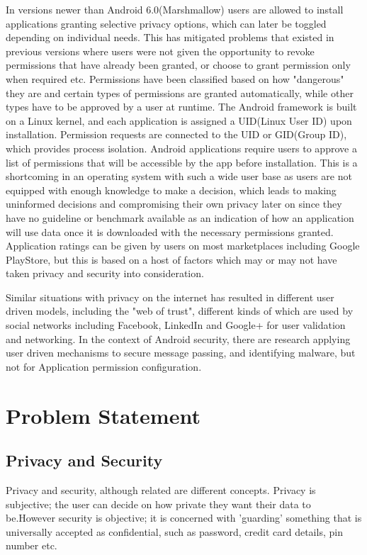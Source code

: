 In versions newer than Android 6.0(Marshmallow) users are allowed to install applications granting selective privacy options, which can later be toggled depending on individual needs. This has mitigated problems that existed in previous versions where users were not given the opportunity to revoke permissions that have already been granted, or choose to grant permission only when required etc. Permissions have been classified based on how "dangerous" they are and certain types of permissions are granted automatically, while other types have to be approved by a user at runtime. The Android framework is built on a Linux kernel, and each application is assigned a UID(Linux User ID) upon installation. Permission requests are connected to the UID or GID(Group ID), which provides process isolation. Android applications require users to approve a list of permissions that will be accessible by the app before installation. This is a shortcoming in an operating system with such a wide user base as users are not equipped with enough knowledge to make a decision, which leads to making uninformed decisions and compromising their own privacy later on since they have no guideline or benchmark available as an indication of how an application will use data once it is downloaded with the necessary permissions granted. Application ratings can be given by users on most marketplaces including Google PlayStore, but this is based on a host of factors which may or may not have taken privacy and security into consideration.
\smallskip

Similar situations with privacy on the internet has resulted in different user driven models, including the "web of trust", different kinds of which are used by social networks including Facebook, LinkedIn and Google+ for user validation and networking\cite{d}. In the context of Android security, there are research applying user driven mechanisms to secure message passing, and identifying malware, but not for Application permission configuration\cite{aziz2012android}. 
\smallskip



\section{Problem Statement}
\subsection{Privacy and Security}

Privacy and security, although related are different concepts. Privacy is subjective; the user can decide on how private they want their data to be.However security is objective; it is concerned with 'guarding' something that is universally accepted as confidential, such as password, credit card details, pin number etc.
\smallskip


